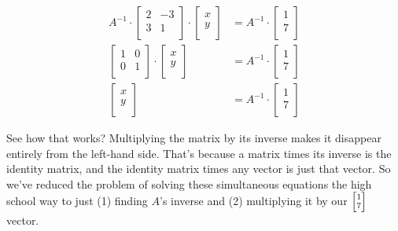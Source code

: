 \vspace{-.15in}
\begin{align*}
A^{-1} \cdot
\begin{bmatrix}
2 & -3 \\
3 & 1 \\
\end{bmatrix} \cdot
\begin{bmatrix}
x \\ y \\
\end{bmatrix} &=
A^{-1} \cdot
\begin{bmatrix}
1 \\ 7 \\
\end{bmatrix} \\
\begin{bmatrix}
1 & 0 \\
0 & 1 \\
\end{bmatrix} \cdot
\begin{bmatrix}
x \\ y \\
\end{bmatrix} &=
A^{-1} \cdot
\begin{bmatrix}
1 \\ 7 \\
\end{bmatrix} \\
\begin{bmatrix}
x \\ y \\
\end{bmatrix} &=
A^{-1} \cdot
\begin{bmatrix}
1 \\ 7 \\
\end{bmatrix}
\end{align*}
\vspace{-.15in}

See how that works? Multiplying the matrix by its inverse makes it disappear
entirely from the left-hand side. That's because a matrix times its inverse is
the identity matrix, and the identity matrix times any vector is just that
vector. So we've reduced the problem of solving these simultaneous equations
the high school way to just (1) finding $A$'s inverse and (2) multiplying it by
our ${\scriptsize \begin{bmatrix} 1 \\ 7 \end{bmatrix}}$ vector.

